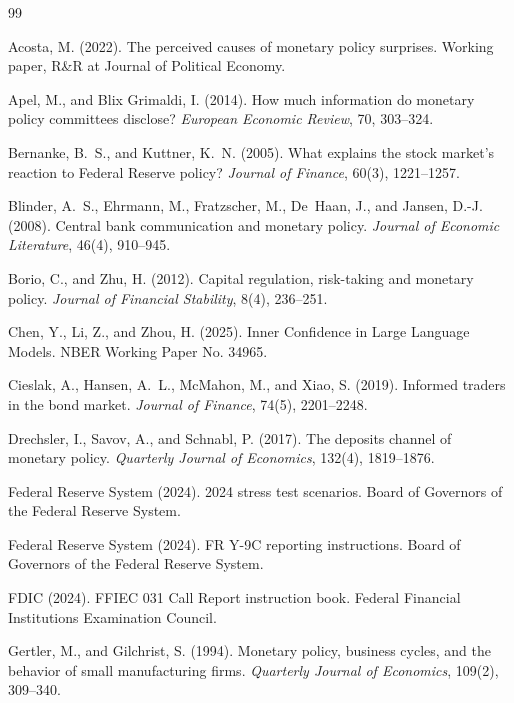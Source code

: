 \documentclass[12pt,a4paper]{article}
\begin{document}
\begin{thebibliography}{99}

Acosta, M. (2022). The perceived causes of monetary policy surprises. Working paper, R\&R at Journal of Political Economy.

Apel, M., and Blix Grimaldi, I. (2014). How much information do monetary policy committees disclose? \textit{European Economic Review}, 70, 303--324.

Bernanke, B.~S., and Kuttner, K.~N. (2005). What explains the stock market's reaction to Federal Reserve policy? \textit{Journal of Finance}, 60(3), 1221--1257.

Blinder, A.~S., Ehrmann, M., Fratzscher, M., De~Haan, J., and Jansen, D.-J. (2008). Central bank communication and monetary policy. \textit{Journal of Economic Literature}, 46(4), 910--945.

Borio, C., and Zhu, H. (2012). Capital regulation, risk-taking and monetary policy. \textit{Journal of Financial Stability}, 8(4), 236--251.

Chen, Y., Li, Z., and Zhou, H. (2025). Inner Confidence in Large Language Models. NBER Working Paper No. 34965.

Cieslak, A., Hansen, A.~L., McMahon, M., and Xiao, S. (2019). Informed traders in the bond market. \textit{Journal of Finance}, 74(5), 2201--2248.

Drechsler, I., Savov, A., and Schnabl, P. (2017). The deposits channel of monetary policy. \textit{Quarterly Journal of Economics}, 132(4), 1819--1876.

Federal Reserve System (2024). 2024 stress test scenarios. Board of Governors of the Federal Reserve System.

Federal Reserve System (2024). FR Y-9C reporting instructions. Board of Governors of the Federal Reserve System.

FDIC (2024). FFIEC 031 Call Report instruction book. Federal Financial Institutions Examination Council.

Gertler, M., and Gilchrist, S. (1994). Monetary policy, business cycles, and the behavior of small manufacturing firms. \textit{Quarterly Journal of Economics}, 109(2), 309--340.


\end{thebibliography}
\end{document}
